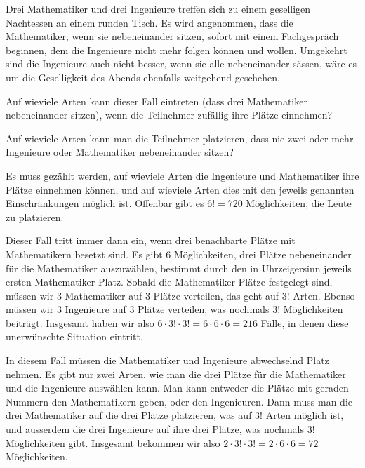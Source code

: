Drei Mathematiker und drei Ingenieure treffen sich zu einem
geselligen Nachtessen an einem runden Tisch.
Es wird angenommen, dass die Mathematiker, wenn sie nebeneinander
sitzen, sofort mit einem Fachgespräch beginnen, dem
die Ingenieure nicht mehr folgen können und wollen. Umgekehrt
sind die Ingenieure auch nicht besser, wenn sie alle nebeneinander
sässen, wäre es um die Geselligkeit des Abends ebenfalls weitgehend
geschehen.
\begin{teilaufgaben}
\item
Auf wieviele Arten kann dieser Fall eintreten (dass drei Mathematiker
nebeneinander sitzen),
wenn die Teilnehmer zufällig ihre Plätze einnehmen?
\item
Auf wieviele Arten kann man die Teilnehmer platzieren, dass nie zwei oder
mehr Ingenieure oder Mathematiker nebeneinander sitzen?
\end{teilaufgaben}

\begin{loesung}
Es muss gezählt werden, auf wieviele Arten die Ingenieure und Mathematiker
ihre Plätze einnehmen können, und auf wieviele Arten dies mit den
jeweils genannten Einschränkungen möglich ist. Offenbar gibt es $6!=720$
Möglichkeiten, die Leute zu platzieren.
\begin{teilaufgaben}
\item Dieser Fall tritt immer dann ein, wenn drei benachbarte Plätze
mit Mathematikern besetzt sind.
Es gibt 6 Möglichkeiten, drei Plätze
nebeneinander für die Mathematiker auszuwählen, bestimmt durch den
in Uhrzeigersinn jeweils ersten Mathematiker-Platz.
Sobald die Mathematiker-Plätze festgelegt sind, müssen wir 3 Mathematiker
auf 3 Plätze verteilen, das geht auf $3!$ Arten. Ebenso müssen wir
3 Ingenieure auf 3 Plätze verteilen, was nochmals $3!$ Möglichkeiten
beiträgt. Insgesamt haben wir also $6\cdot 3!\cdot 3!=6\cdot 6\cdot 6=216$
Fälle, in denen diese unerwünschte Situation eintritt.
\item In diesem Fall müssen die Mathematiker und Ingenieure abwechselnd
Platz nehmen. Es gibt nur zwei Arten, wie man die drei Plätze für die
Mathematiker und die Ingenieure auswählen kann. Man kann entweder die
Plätze mit geraden Nummern den Mathematikern geben, oder den Ingenieuren.
Dann muss man die drei Mathematiker auf die drei Plätze platzieren,
was auf $3!$ Arten möglich ist, und ausserdem die drei Ingenieure auf
ihre drei Plätze, was nochmals $3!$ Möglichkeiten gibt. Insgesamt bekommen
wir also $2\cdot 3!\cdot 3!=2\cdot 6\cdot 6=72$ Möglichkeiten.
\qedhere
\end{teilaufgaben}
\end{loesung}
